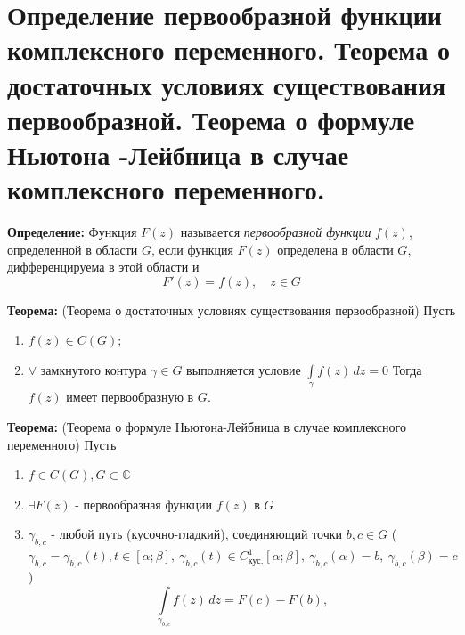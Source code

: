 \section{Определение первообразной функции комплексного переменного.
Теорема о достаточных условиях существования первообразной. Теорема о
формуле Ньютона -Лейбница в случае комплексного
переменного.}\label{ux43eux43fux440ux435ux434ux435ux43bux435ux43dux438ux435-ux43fux435ux440ux432ux43eux43eux431ux440ux430ux437ux43dux43eux439-ux444ux443ux43dux43aux446ux438ux438-ux43aux43eux43cux43fux43bux435ux43aux441ux43dux43eux433ux43e-ux43fux435ux440ux435ux43cux435ux43dux43dux43eux433ux43e.-ux442ux435ux43eux440ux435ux43cux430-ux43e-ux434ux43eux441ux442ux430ux442ux43eux447ux43dux44bux445-ux443ux441ux43bux43eux432ux438ux44fux445-ux441ux443ux449ux435ux441ux442ux432ux43eux432ux430ux43dux438ux44f-ux43fux435ux440ux432ux43eux43eux431ux440ux430ux437ux43dux43eux439.-ux442ux435ux43eux440ux435ux43cux430-ux43e-ux444ux43eux440ux43cux443ux43bux435-ux43dux44cux44eux442ux43eux43dux430--ux43bux435ux439ux431ux43dux438ux446ux430-ux432-ux441ux43bux443ux447ux430ux435-ux43aux43eux43cux43fux43bux435ux43aux441ux43dux43eux433ux43e-ux43fux435ux440ux435ux43cux435ux43dux43dux43eux433ux43e.}

\textbf{Определение:} Функция \(F(z)\) называется \emph{первообразной
функции} \(f(z)\), определенной в области \(G\), если функция \(F(z)\)
определена в области \(G\), дифференцируема в этой области и \[
F'(z)=f(z),\quad z\in G
\]

\textbf{Теорема:} (Теорема о достаточных условиях существования
первообразной) Пусть

\begin{enumerate}
\def\labelenumi{\arabic{enumi}.}
\tightlist
\item
  \(f(z)\in C(G)\);
\item
  \(\forall\) замкнутого контура \(\gamma \in G\) выполняется условие
  \(\int\limits_{\gamma}f(z)\,dz=0\) Тогда \(f(z)\) имеет первообразную
  в \(G\).
\end{enumerate}

\textbf{Теорема:} (Теорема о формуле Ньютона-Лейбница в случае
комплексного переменного) Пусть

\begin{enumerate}
\def\labelenumi{\arabic{enumi}.}
\tightlist
\item
  \(f\in C(G), G\subset \mathbb{C}\)
\item
  \(\exists F(z)\) - первообразная функции \(f(z)\) в \(G\)
\item
  \(\gamma_{b,c}\) - любой путь (кусочно-гладкий), соединяющий точки
  \(b,c\in G\)
  (\(\gamma_{b,c}=\gamma_{b,c}(t), t\in[\alpha;\beta ], \ \gamma_{b,c}(t)\in C^{1}_{\text{кус.}}[\alpha;\beta], \ \gamma_{b,c}(\alpha)=b, \ \gamma_{b,c}(\beta)=c\))
  \[
  \int\limits_{\gamma_{b,c}}f(z)\,dz=F(c)-F(b),
  \]
\end{enumerate}
